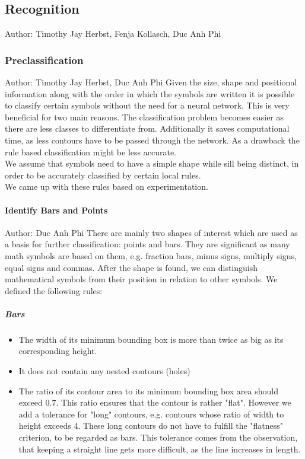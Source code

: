 \documentclass[12pt]{article}
\begin{document}
	\subsection{Recognition}
	\small{Author: Timothy Jay Herbst, Fenja Kollasch, Duc Anh Phi} \newline \newline
	\subsubsection{Preclassification}
	\small{Author: Timothy Jay Herbst, Duc Anh Phi} \newline \newline
	Given the size, shape and positional information along with the order in which the symbols are written it is possible to classify certain symbols without the need for a neural network. This is very beneficial for two main reasons. The classification problem becomes easier as there are less classes to differentiate from. Additionally it saves computational time, as less contours have to be passed through the network. As a drawback the rule based classification might be less accurate.\\
	We assume that symbols need to have a simple shape while sill being distinct, in order to be accurately classified by certain local rules.\\
	We came up with these rules based on experimentation.
	
	\paragraph{Identify Bars and Points}
	\small{Author: Duc Anh Phi} \newline \newline
	There are mainly two shapes of interest which are used as a basis for further classification: points and bars. They are significant as many math symbols are based on them, e.g. fraction bars, minus signs, multiply signs, equal signs and commas. After the shape is found, we can distinguish mathematical symbols from their position in relation to other symbols. We defined the following rules:
	
	\subparagraph{Bars}\label{bars}
	\begin{itemize}
		\item The width of its minimum bounding box is more than twice as big as its corresponding height.
		\item It does not contain any nested contours (holes)
		\item The ratio of its contour area to its minimum bounding box area should exceed 0.7. This ratio ensures that the contour is rather "flat". However we add a tolerance for "long" contours, e.g. contours whose ratio of width to height exceeds 4. These long contours do not have to fulfill the "flatness" criterion, to be regarded as bars. This tolerance comes from the observation, that keeping a straight line gets more difficult, as the line increases in length. 
	\end{itemize}
\end{document}
